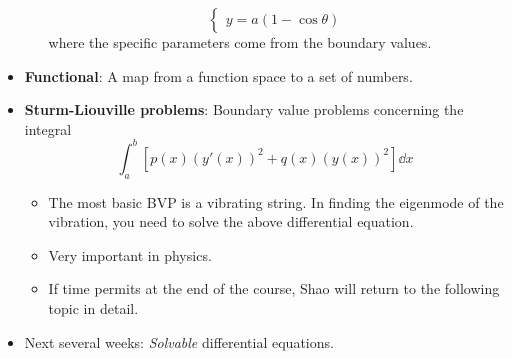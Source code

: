 \documentclass[../notes.tex]{subfiles}
\begin{document}
\begin{itemize}
\begin{itemize}
\begin{equation*}
\begin{cases}
                y = a(1-\cos\theta)
            \end{cases}
        \end{equation*}
        where the specific parameters come from the boundary values.
    \end{itemize}
    \item \textbf{Functional}: A map from a function space to a set of numbers.
    \item \textbf{Sturm-Liouville problems}: Boundary value problems concerning the integral
    \begin{equation*}
        \int_a^b\left[ p(x)(y'(x))^2+q(x)(y(x))^2 \right]\dd{x}
    \end{equation*}
    \begin{itemize}
        \item The most basic BVP is a vibrating string. In finding the eigenmode of the vibration, you need to solve the above differential equation.
        \item Very important in physics.
        \item If time permits at the end of the course, Shao will return to the following topic in detail.
    \end{itemize}
    \item Next several weeks: \emph{Solvable} differential equations.
\end{itemize}
\end{document}
